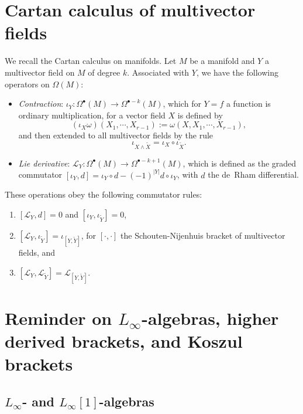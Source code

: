\documentclass[11pt,thmsa]{amsart}
\theoremstyle{definition}
\newcommand{\Lie}{\mathcal{L}}
\begin{document}
\appendix
{}%






\section{Cartan calculus of multivector fields}
\label{sec:Cartan}


We recall the Cartan calculus on manifolds. Let $M$ be a manifold and $Y$ a multivector field on $M$ of degree $k$. Associated with $Y$, we have the following operators on $\Omega(M)$:
\begin{itemize}
\item {\em Contraction}: $\iota_Y: \Omega^\bullet(M)\to \Omega^{\bullet-k}(M)$, which for $Y=f$ a function is ordinary multiplication, for a vector field $X$ is defined by
$$(\iota_X \omega)(X_1,\cdots, X_{r-1}):=\omega(X,X_1,\cdots,X_{r-1}),$$
and then extended to all multivector fields by the rule
$$\iota_{X\wedge \tilde{X}} = \iota_X \circ \iota_{\tilde{X}}.$$
\item {\em Lie derivative}: $\Lie_Y: \Omega^\bullet(M) \to \Omega^{\bullet - k +1}(M)$, which is defined as the graded commutator $[\iota_Y,d]=\iota_Y\circ d - (-1)^{|Y|}d\circ \iota_Y$, with $d$ the de~Rham differential.
\end{itemize}

These operations obey the following commutator rules:
\begin{enumerate}
\item $[\Lie_Y,d]=0$ and $[\iota_Y,\iota_{\tilde{Y}}]=0$,
\item $[\Lie_Y,\iota_{\tilde{Y}}]=\iota_{[Y,\tilde{Y}]}$, for $[\cdot,\cdot]$ the Schouten-Nijenhuis bracket of multivector fields, and
\item $[\Lie_Y,\Lie_{\tilde{Y}}]=\Lie_{[Y,\tilde{Y}]}$.
\end{enumerate}



\section{Reminder on $L_\infty$-algebras, higher derived brackets, and Koszul brackets}
\label{appendix: reminder L-infty}

\subsection{$L_\infty$- and $L_\infty[1]$-algebras}
\end{document}
